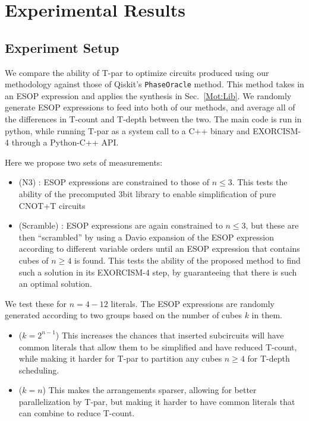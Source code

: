 \section{Experimental Results}
\label{Exp}
\subsection{Experiment Setup}
\label{Exp:Set}
We compare the ability of T-par to optimize circuits produced using our methodology against those of
Qiskit's \texttt{PhaseOracle} method. This method takes in an ESOP expression and applies the synthesis in
Sec.~\ref{Mot:Lib}. We randomly generate ESOP expressions to feed into both of our methods, and average all
of the differences in T-count and T-depth between the two. The main code is run in python, while running
T-par as a system call to a C++ binary and EXORCISM-4 through a Python-C++ API.

Here we propose two sets of measurements:

\begin{itemize}
\item (N3) : ESOP expressions are constrained to those of $n \leq 3$. This tests the ability of the
  precomputed 3bit library to enable simplification of pure CNOT+T circuits
\item (Scramble) : ESOP expressions are again constrained to $n \leq 3$, but these are then ``scrambled''
  by using a Davio expansion of the ESOP expression according to different variable orders until an ESOP expression
  that contains cubes of $n \geq 4$ is found. This tests the ability of the proposed method to find such a
  solution in its EXORCISM-4 step, by guaranteeing that there is such an optimal solution.
\end{itemize}

We test these for $n=4-12$ literals. The ESOP expressions are randomly generated according to two groups
based on the number of cubes $k$ in them.

\begin{itemize}
\item ($k=2^{n-1}$) This increases the chances that inserted subcircuits will have common literals that allow them
  to be simplified and have reduced T-count, while making it harder for T-par to partition any cubes $n \geq 4$
  for T-depth scheduling.
\item ($k=n$) This makes the arrangements sparser, allowing for better parallelization by T-par, but making
  it harder to have common literals that can combine to reduce T-count.
\end{itemize}

